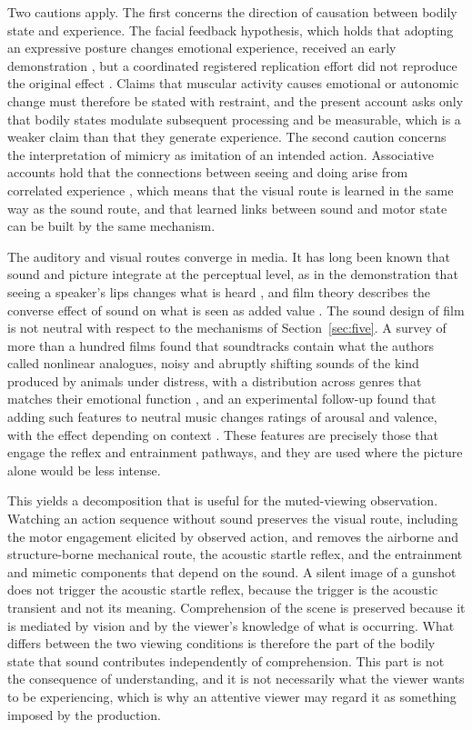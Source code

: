 \documentclass[11pt]{article}
\theoremstyle{plain}
\theoremstyle{definition}
\begin{document}
Two cautions apply. The first concerns the direction of causation between bodily state and experience. The facial feedback hypothesis, which holds that adopting an expressive posture changes emotional experience, received an early demonstration \citep{strack1988}, but a coordinated registered replication effort did not reproduce the original effect \citep{wagenmakers2016}. Claims that muscular activity causes emotional or autonomic change must therefore be stated with restraint, and the present account asks only that bodily states modulate subsequent processing and be measurable, which is a weaker claim than that they generate experience. The second caution concerns the interpretation of mimicry as imitation of an intended action. Associative accounts hold that the connections between seeing and doing arise from correlated experience \citep{heyes2010,heyes2011}, which means that the visual route is learned in the same way as the sound route, and that learned links between sound and motor state can be built by the same mechanism.

The auditory and visual routes converge in media. It has long been known that sound and picture integrate at the perceptual level, as in the demonstration that seeing a speaker's lips changes what is heard \citep{mcgurk1976}, and film theory describes the converse effect of sound on what is seen as added value \citep{chion1994}. The sound design of film is not neutral with respect to the mechanisms of Section~\ref{sec:five}. A survey of more than a hundred films found that soundtracks contain what the authors called nonlinear analogues, noisy and abruptly shifting sounds of the kind produced by animals under distress, with a distribution across genres that matches their emotional function \citep{blumstein2010}, and an experimental follow-up found that adding such features to neutral music changes ratings of arousal and valence, with the effect depending on context \citep{blumstein2012}. These features are precisely those that engage the reflex and entrainment pathways, and they are used where the picture alone would be less intense.

This yields a decomposition that is useful for the muted-viewing observation. Watching an action sequence without sound preserves the visual route, including the motor engagement elicited by observed action, and removes the airborne and structure-borne mechanical route, the acoustic startle reflex, and the entrainment and mimetic components that depend on the sound. A silent image of a gunshot does not trigger the acoustic startle reflex, because the trigger is the acoustic transient and not its meaning. Comprehension of the scene is preserved because it is mediated by vision and by the viewer's knowledge of what is occurring. What differs between the two viewing conditions is therefore the part of the bodily state that sound contributes independently of comprehension. This part is not the consequence of understanding, and it is not necessarily what the viewer wants to be experiencing, which is why an attentive viewer may regard it as something imposed by the production.
\end{document}
